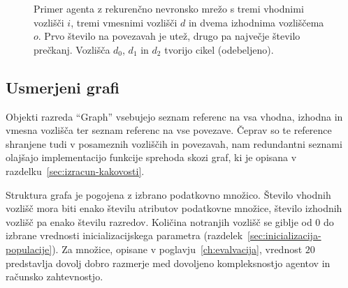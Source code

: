 \documentclass[a4paper,12pt,openright]{book}
\begin{document}
    \begin{figure}[H]
        \centering
        \caption{Primer agenta z rekurenčno nevronsko mrežo s tremi vhodnimi vozlišči $i$, tremi vmesnimi vozlišči $d$ in
        dvema izhodnima vozliščema $o$. Prvo število na povezavah je utež, drugo pa največje število prečkanj. Vozlišča
            $d_0$, $d_1$ in $d_2$ tvorijo cikel (odebeljeno).}
        \label{fig:skica_agenta}
    \end{figure}

    \subsection{Usmerjeni grafi}\label{subsec:usmerjeni-grafi}
    Objekti razreda \enquote{Graph} vsebujejo seznam referenc na vsa vhodna, izhodna in vmesna vozlišča ter seznam referenc
    na vse povezave.
    Čeprav so te reference shranjene tudi v posameznih vozliščih in povezavah, nam redundantni seznami olajšajo
    implementacijo funkcije sprehoda skozi graf, ki je opisana v razdelku~\ref{sec:izracun-kakovosti}.

    Struktura grafa je pogojena z izbrano podatkovno množico.
    Število vhodnih vozlišč mora biti enako številu atributov podatkovne mno\-ži\-ce, šte\-vi\-lo izhodnih vozlišč pa enako številu razredov.
    Količina notranjih vozlišč se giblje od 0 do izbrane vrednosti inicializacijskega parametra (razdelek~\ref{sec:inicializacija-populacije}).
    Za množice, opisane v poglavju~\ref{ch:evalvacija}, vrednost $20$ predstavlja dovolj dobro razmerje med dovoljeno kompleksnostjo agentov in
    računsko zahtevnostjo.
\end{document}
